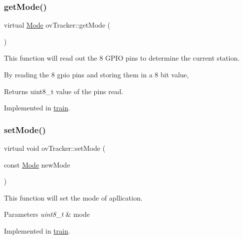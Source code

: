 \subsubsection{\texorpdfstring{get\+Mode()}{getMode()}}
{\footnotesize\ttfamily virtual \hyperlink{stations_8h_ad03936209251465257e0fdcfb33dbf91}{Mode} ov\+Tracker\+::get\+Mode (\begin{DoxyParamCaption}{ }\end{DoxyParamCaption})\hspace{0.3cm}{\ttfamily [pure virtual]}}



This function will read out the 8 G\+P\+IO pins to determine the current station. 

By reading the 8 gpio pins and storing them in a 8 bit value, \begin{DoxyReturn}{Returns}
uint8\+\_\+t value of the pins read. 
\end{DoxyReturn}


Implemented in \hyperlink{classtrain_ae788938711f5940abc9ad9fa09a77011}{train}.

\mbox{\label{classovTracker_a776f469f9db184664e4f4425cca2df32}} 
\subsubsection{\texorpdfstring{set\+Mode()}{setMode()}}
{\footnotesize\ttfamily virtual void ov\+Tracker\+::set\+Mode (\begin{DoxyParamCaption}\item[{const \hyperlink{stations_8h_ad03936209251465257e0fdcfb33dbf91}{Mode}}]{new\+Mode }\end{DoxyParamCaption})\hspace{0.3cm}{\ttfamily [pure virtual]}}



This function will set the mode of apllication. 


\begin{DoxyParams}{Parameters}
{\em uint8\+\_\+t} & mode \\
\hline
\end{DoxyParams}


Implemented in \hyperlink{classtrain_ae4cd3a06c0b736f2de38dd7987e9576e}{train}.

\mbox{\label{classovTracker_a9611f8fe5ed1937262ebcd89bd7ee617}} 
